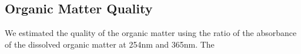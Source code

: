 
\subsection{Organic Matter Quality}

 We estimated the quality of the organic matter using the ratio of the absorbance of the dissolved organic matter at 254nm and 365nm.  The 
